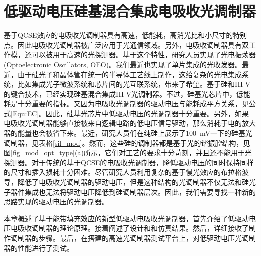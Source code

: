 \chapter{低驱动电压硅基混合集成电吸收光调制器}
基于QCSE效应的电吸收光调制器具有高速，低能耗，高消光比和小尺寸的特别点\cite{tang2012energy, fukano2006very}。因此电吸收光调制器被广泛应用于光通信领域。另外，电吸收调制器具有双工作模，还可以被用于高速的光探测器\cite{welstand1996dual}。基于这个特性，研究人员实现了光电振荡器(Optoelectronic Oscillators, OEO)\cite{zhou2014compact}。我们最近也实现了单片集成的光收发器\cite{chen2016wavelength}。最近，由于硅光子和晶体管在统一的半导体工艺线上制作，这给复杂的光电集成系统，比如集成光子微波系统\cite{Marpaung2013integrated}和芯片间的光互联系统\cite{sun2015single}，带来了希望。基于硅和III-V的键合技术，已经实现硅基混合集成III-V光调制器\cite{kuo2008high,tang201150,tang2012over,tang2012energy,chen2011forty,Srinivasan2012micro,fu20155}。不过，硅基光芯片中，低能耗是十分重要的指标。又因为电吸收光调制器的驱动电压与能耗成平方关系，见公式\ref{Equ:EC}。因此，硅基光芯片中低驱动电压的光调制器十分重要。另外，如果电吸收光调制器能够直接被来自逻辑电路的低电压信号驱动，那么消耗于电的放大器的能量也会被省下来。最近，研究人员们在纯硅上展示了100~mV一下的硅基光调制器，见表格\ref{sil_mod}。然而，这些硅的调制器都是基于光的谐振腔结构，见图\ref{fig_mod_opt_type}(a)所示，它们对工艺的要求十分苛刻，并且还不能用于光探测器。对于传统的基于QCSE的电吸收光调制器，降低驱动电压的同时保持同样的尺寸和插入损耗十分困难。尽管研究人员利用复杂的基于慢光效应的布拉格波导\cite{gulow-voltage2013}，降低了电吸收光调制器的驱动电压，但是这种结构的光调制器不仅无法和硅光子器件集成也无法将驱动电压降低到硅调制器层次。因此，我们需要寻找一种新的思路实现的驱动电压的光调制器。

本章概述了基于能带填充效应的新型低驱动电吸收光调制器，首先介绍了低驱动电压电吸收调制器的理论原理。接着阐述了设计和和仿真结果。然后，详细接收了制作调制器的步骤。最后，在搭建的高速光调制器测试平台上，对低驱动电压光调制器的性能进行了测试。
